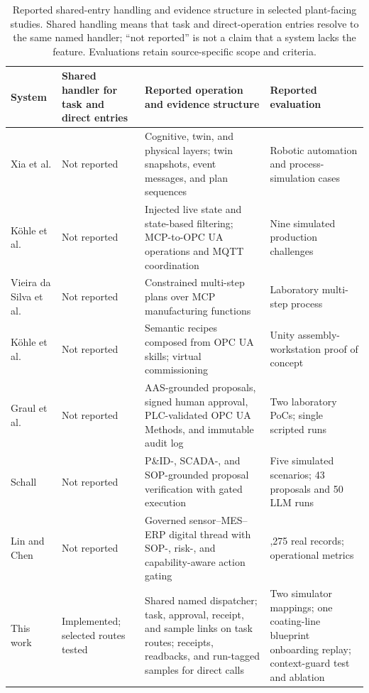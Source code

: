 \begin{table}[!t]
\centering
\caption{Reported shared-entry handling and evidence structure in selected
plant-facing studies. Shared handling means that task and direct-operation
entries resolve to the same named handler; ``not reported'' is not a claim
that a system lacks the feature. Evaluations retain source-specific scope and criteria.}
\label{tab:nearest}
\small
\setlength{\tabcolsep}{3pt}
\begin{tabularx}{\textwidth}{@{}>{\raggedright\arraybackslash}p{1.45cm}>{\raggedright\arraybackslash}p{2.6cm}>{\raggedright\arraybackslash}p{5.1cm}>{\raggedright\arraybackslash}X@{}}
\toprule
System & Shared handler for task and direct entries & Reported operation and evidence structure & Reported evaluation \\
\midrule
Xia et al. \cite{xia2025architecture} & Not reported & Cognitive, twin, and physical layers; twin snapshots, event messages, and plan sequences & Robotic automation and process-simulation cases \\
K{\"o}hle et al. \cite{koehle2026llmdriven} & Not reported & Injected live state and state-based filtering; MCP-to-OPC UA operations and MQTT coordination & Nine simulated production challenges \\
Vieira da Silva et al. \cite{silva2025mcpmanufacturing} & Not reported & Constrained multi-step plans over MCP manufacturing functions & Laboratory multi-step process \\
K{\"o}hle et al. \cite{koehle2025semanticrecipes} & Not reported & Semantic recipes composed from OPC UA skills; virtual commissioning & Unity assembly-workstation proof of concept \\
Graul et al. \cite{graul2026aas} & Not reported & AAS-grounded proposals, signed human approval, PLC-validated OPC UA Methods, and immutable audit log & Two laboratory PoCs; single scripted runs \\
Schall \cite{schall2026safe} & Not reported & P\&ID-, SCADA-, and SOP-grounded proposal verification with gated execution & Five simulated scenarios; 43 proposals and 50 LLM runs \\
Lin and Chen \cite{lin2026agentic} & Not reported & Governed sensor--MES--ERP digital thread with SOP-, risk-, and capability-aware action gating & 25,275 real records; operational metrics \\
\midrule
This work & Implemented; selected routes tested & Shared named dispatcher; task, approval, receipt, and sample links on task routes; receipts, readbacks, and run-tagged samples for direct calls & Two simulator mappings; one coating-line blueprint onboarding replay; context-guard test and ablation \\
\bottomrule
\end{tabularx}
\end{table}

